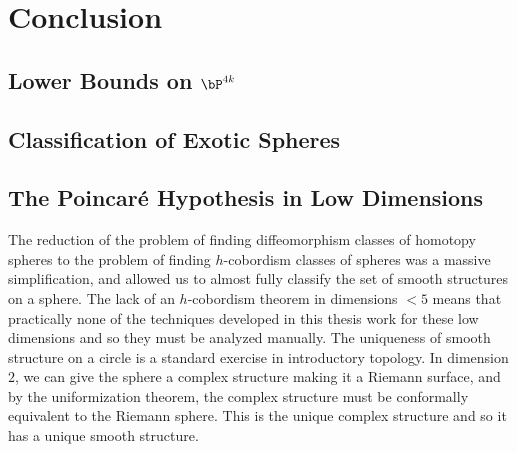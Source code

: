 \chapter{Conclusion}

\begin{epigraph}{10em}{}
\end{epigraph}

\section{Lower Bounds on $\bP^{4k}$}\label{sec:lower-bounds}

\section{Classification of Exotic Spheres}\label{sec:classification}

\section{The Poincar\'e Hypothesis in Low Dimensions}\label{sec:low-dimensions}

The reduction of the problem of finding diffeomorphism classes of homotopy spheres to the problem of finding $h$-cobordism classes of spheres was a massive simplification, and allowed us to almost fully classify the set of smooth structures on a sphere.
The lack of an $h$-cobordism theorem in dimensions $<5$ means that practically none of the techniques developed in this thesis work for these low dimensions and so they must be analyzed manually. The uniqueness of smooth structure on a circle is a standard exercise in introductory topology. In dimension $2$, we can give the sphere a complex structure making it a Riemann surface, and by the uniformization theorem, the complex structure must be conformally equivalent to the Riemann sphere. This is the unique complex structure and so it has a unique smooth structure.

